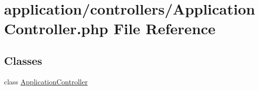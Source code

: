 \hypertarget{_application_controller_8php}{\section{application/controllers/\-Application\-Controller.php File Reference}
\label{_application_controller_8php}
}
\subsection*{Classes}
\begin{DoxyCompactItemize}
\item 
class \hyperlink{class_application_controller}{Application\-Controller}
\end{DoxyCompactItemize}

